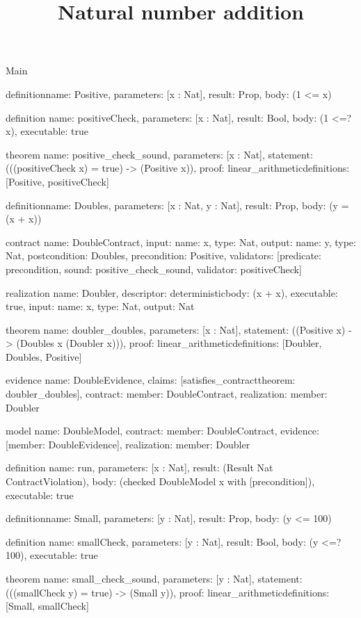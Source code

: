 \begin{lexlean}{Main}
\title{Natural number addition}
\begin{semanticmodule}
definition{name: Positive, parameters: [x : Nat], result: Prop, body: (1 <= x)}

definition{
  name: positiveCheck,
  parameters: [x : Nat],
  result: Bool,
  body: (1 <=? x),
  executable: true
}

theorem{
  name: positive_check_sound,
  parameters: [x : Nat],
  statement: (((positiveCheck x) = true) -> (Positive x)),
  proof: linear_arithmetic{definitions: [Positive, positiveCheck]}
}

definition{name: Doubles, parameters: [x : Nat, y : Nat], result: Prop, body: (y = (x + x))}

contract{
  name: DoubleContract,
  input: {name: x, type: Nat},
  output: {name: y, type: Nat},
  postcondition: Doubles,
  precondition: Positive,
  validators: [{predicate: precondition, sound: positive_check_sound, validator: positiveCheck}]
}

realization{
  name: Doubler,
  descriptor: deterministic{body: (x + x)},
  executable: true,
  input: {name: x, type: Nat},
  output: Nat
}

theorem{
  name: doubler_doubles,
  parameters: [x : Nat],
  statement: ((Positive x) -> (Doubles x (Doubler x))),
  proof: linear_arithmetic{definitions: [Doubler, Doubles, Positive]}
}

evidence{
  name: DoubleEvidence,
  claims: [satisfies_contract{theorem: doubler_doubles}],
  contract: {member: DoubleContract},
  realization: {member: Doubler}
}

model{
  name: DoubleModel,
  contract: {member: DoubleContract},
  evidence: [{member: DoubleEvidence}],
  realization: {member: Doubler}
}

definition{
  name: run,
  parameters: [x : Nat],
  result: (Result Nat ContractViolation),
  body: (checked DoubleModel x with [precondition]),
  executable: true
}

definition{name: Small, parameters: [y : Nat], result: Prop, body: (y <= 100)}

definition{
  name: smallCheck,
  parameters: [y : Nat],
  result: Bool,
  body: (y <=? 100),
  executable: true
}

theorem{
  name: small_check_sound,
  parameters: [y : Nat],
  statement: (((smallCheck y) = true) -> (Small y)),
  proof: linear_arithmetic{definitions: [Small, smallCheck]}
}


\end{semanticmodule}
\end{lexlean}
